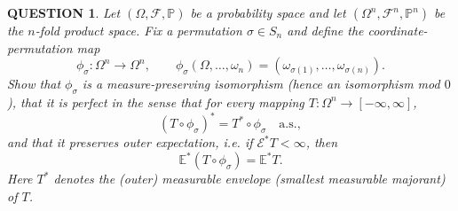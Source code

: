 \documentclass[12pt]{article}
\renewcommand{\(}{\left(}%
\renewcommand{\)}{\right)}%
\renewcommand{\[}{\left[}%
\renewcommand{\]}{\right]}%
\newcommand{\e}{\mathscr{E}}
\newtheorem{question}{QUESTION}[section]}
\begin{document}
  \begin{question}
Let $(\Omega,\mathscr F,\mathbb P)$ be a probability space and let
$(\Omega^n,\mathscr F^{n},\mathbb P^{n})$ be the $n$-fold product space.
Fix a permutation $\sigma\in S_n$ and define the coordinate-permutation map
\begin{equation*}
\phi_\sigma:\Omega^n\to\Omega^n,\qquad
\phi_\sigma(\Omega ,\dots,\omega_n)=(\omega_{\sigma(1)},\dots,\omega_{\sigma(n)}).
\end{equation*}
Show that $\phi_\sigma$ is a measure-preserving isomorphism (hence an isomorphism mod $0$),
that it is \emph{perfect} in the sense that for every mapping $T:\Omega^n\to[-\infty,\infty]$,
\begin{equation*}
(T\circ\phi_\sigma)^* = T^*\circ\phi_\sigma\quad \text{a.s.},
\end{equation*}
and that it preserves outer expectation, i.e. if $\e^* T<\infty$, then
\begin{equation*}
\mathbb E^*(T\circ\phi_\sigma)=\mathbb E^*T.
\end{equation*}
Here $T^*$ denotes the (outer) measurable envelope (smallest measurable majorant) of $T$.
\end{question}
\end{document}
